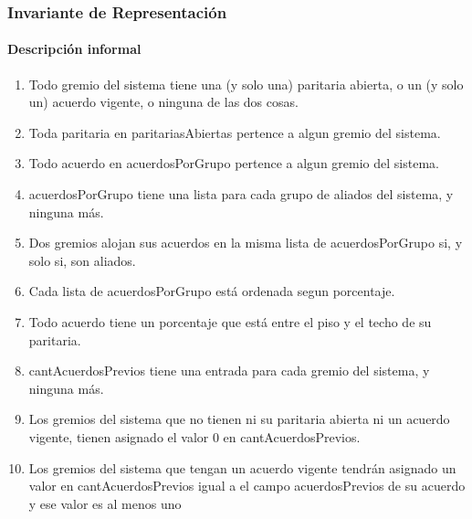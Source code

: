 \subsubsection{Invariante de Representaci\'on}

\paragraph{Descripci\'on informal}
\begin{enumerate}

	\item Todo gremio del sistema tiene una (y solo una) paritaria abierta, o un (y solo un) acuerdo vigente, o ninguna de las dos cosas.
	\item Toda paritaria en paritariasAbiertas pertence a algun gremio del sistema.
	\item Todo acuerdo en acuerdosPorGrupo pertence a algun gremio del sistema.
	\item acuerdosPorGrupo tiene una lista para cada grupo de aliados del sistema, y ninguna m\'as.
	\item Dos gremios alojan sus acuerdos en la misma lista de acuerdosPorGrupo si, y solo si, son aliados.
	\item Cada lista de acuerdosPorGrupo est\'a ordenada segun porcentaje.
	\item Todo acuerdo tiene un porcentaje que est\'a entre el piso y el techo de su paritaria.
	\item cantAcuerdosPrevios tiene una entrada para cada gremio del sistema, y ninguna m\'as.
	\item Los gremios del sistema que no tienen ni su paritaria abierta ni un acuerdo vigente, tienen asignado el valor 0 en cantAcuerdosPrevios.
	\item Los gremios del sistema que tengan un acuerdo vigente tendr\'an asignado un valor en cantAcuerdosPrevios igual a el campo acuerdosPrevios de su acuerdo y  ese valor es al menos uno


\end{enumerate}

